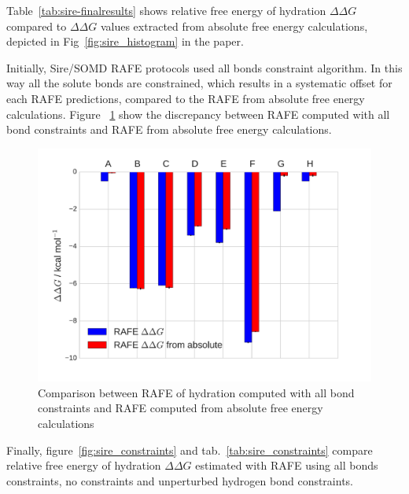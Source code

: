 \documentclass[journal=jctcce,manuscript=suppinfo]{achemso}
\begin{document}
Table~\ref{tab:sire-finalresults} shows relative free energy of hydration 
$\Delta\Delta G$ compared to $\Delta\Delta G$ values extracted from absolute 
free energy calculations, depicted in Fig~\ref{fig:sire_histogram} in the paper.

Initially, Sire/SOMD RAFE protocols used all bonds constraint algorithm. In this way all the solute bonds are constrained, which results in a
systematic offset for each RAFE predictions, compared to the RAFE from absolute free energy calculations.
Figure ~\ref{fig:sire_allbonds} show the discrepancy between RAFE computed with all bond constraints and RAFE from absolute free energy calculations.


\begin{figure}[ht]
  \includegraphics[width=\textwidth]{figures/SI_sire_allbonds_relabs.pdf}
  \caption{Comparison between RAFE of hydration computed with all bond constraints and RAFE computed from absolute free energy calculations}
  \label{fig:sire_allbonds}
\end{figure}

Finally, figure~\ref{fig:sire_constraints} and tab.~\ref{tab:sire_constraints} compare relative free energy of hydration $\Delta \Delta G$ estimated with RAFE using all bonds constraints, no constraints and unperturbed hydrogen bond constraints.
\end{document}
